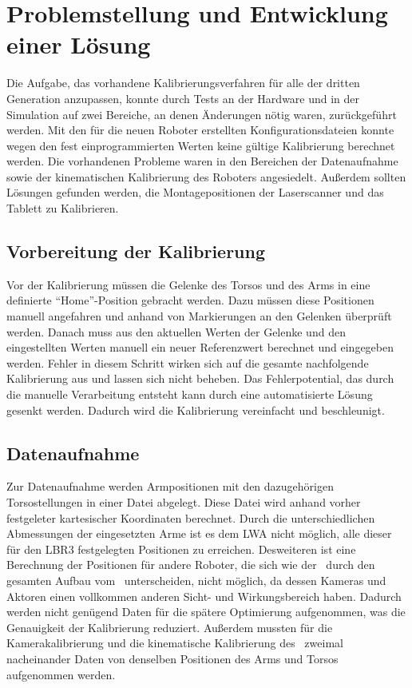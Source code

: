 \chapter{Problemstellung und Entwicklung einer Lösung}

Die Aufgabe, das vorhandene Kalibrierungsverfahren für alle \cob der dritten 
Generation anzupassen, konnte durch Tests an der Hardware und in der Simulation 
auf zwei Bereiche, an denen Änderungen nötig waren, zurückgeführt werden. 
Mit den für die neuen Roboter erstellten Konfigurationsdateien konnte wegen
den fest einprogrammierten Werten keine gültige Kalibrierung berechnet werden.
Die vorhandenen Probleme waren in den Bereichen der Datenaufnahme
sowie der kinematischen Kalibrierung des Roboters angesiedelt. 
Außerdem sollten Lösungen gefunden werden, die Montagepositionen der 
Laserscanner und das Tablett zu Kalibrieren.


\section{Vorbereitung der Kalibrierung}
\label{sec:Vorbereitung der Kalibrierung}
Vor der Kalibrierung müssen die Gelenke des Torsos und des Arms in eine definierte
"`Home"'-Position gebracht werden. Dazu müssen diese Positionen manuell angefahren
und anhand von Markierungen an den Gelenken überprüft werden. Danach muss aus 
den aktuellen Werten der Gelenke und den eingestellten Werten manuell ein neuer
Referenzwert berechnet und eingegeben werden. Fehler in diesem Schritt wirken 
sich auf die gesamte nachfolgende Kalibrierung aus und lassen sich nicht beheben.
Das Fehlerpotential, das durch die manuelle Verarbeitung entsteht kann durch 
eine automatisierte Lösung gesenkt werden. Dadurch wird die Kalibrierung 
vereinfacht und beschleunigt.
\section{Datenaufnahme} %

\label{sec:Datenaufnahme}


Zur Datenaufnahme
werden Armpositionen mit den dazugehörigen Torsostellungen in einer Datei 
abgelegt. Diese Datei wird anhand vorher festgeleter kartesischer Koordinaten
berechnet. Durch die unterschiedlichen Abmessungen der eingesetzten Arme 
ist es dem \ac{LWA} nicht möglich, alle dieser für den \ac{LBR3} festgelegten 
Positionen zu erreichen. Desweiteren ist eine Berechnung der Positionen
für andere Roboter, die sich wie der \raw\ durch den gesamten Aufbau vom 
\cob\ unterscheiden, nicht möglich, da dessen Kameras und Aktoren einen vollkommen
anderen Sicht- und Wirkungsbereich haben. Dadurch werden nicht genügend Daten für die spätere 
Optimierung aufgenommen, was die Genauigkeit der Kalibrierung reduziert.
Außerdem mussten für die Kamerakalibrierung und die kinematische Kalibrierung 
des \cob\ zweimal nacheinander Daten von denselben Positionen des Arms und Torsos
aufgenommen werden.

